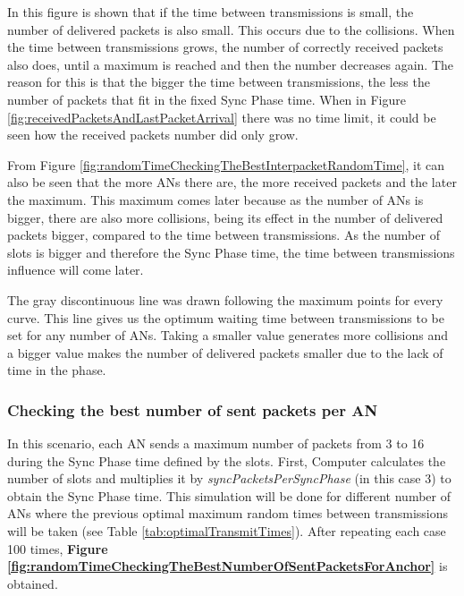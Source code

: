 In this figure is shown that if the time between transmissions is small, the number of delivered packets is also small. This occurs due to the 
collisions. When the time between transmissions grows, the number of correctly received packets also does, until a maximum is reached and then 
the number decreases again. The reason for this is that the bigger the time between transmissions, the less the number of packets that fit 
in the fixed Sync Phase time. When in Figure \ref{fig:receivedPacketsAndLastPacketArrival} there was no time limit, it could be seen how the 
received packets number did only grow.

From Figure \ref{fig:randomTimeCheckingTheBestInterpacketRandomTime}, it can also be seen that the more \acp{AN} there are, the more received packets and
the later the maximum. This maximum comes later because as the number of \acp{AN} is bigger, there are also more collisions, being its effect in the 
number of delivered packets bigger, compared to the time between transmissions. As the number of slots is bigger and therefore the Sync Phase time, the 
time between transmissions influence will come later.

The gray discontinuous line was drawn following the maximum points for every curve. This line gives us the optimum waiting time between transmissions to 
be set for any number of \acp{AN}. Taking a smaller value generates more collisions and a bigger value makes the number of delivered packets smaller due
to the lack of time in the phase.

\subsubsection{Checking the best number of sent packets per \ac{AN}}

In this scenario, each \ac{AN} sends a maximum number of packets from 3 to 16 during the Sync Phase time defined by the slots. First, Computer calculates 
the number of slots and multiplies it by \textit{syncPacketsPerSyncPhase} (in this case 3) to obtain the Sync Phase time. This simulation will be done 
for different number of \acp{AN} where the previous optimal maximum random times between transmissions will be taken (see Table
\ref{tab:optimalTransmitTimes}). After repeating each case 100 times, \textbf{Figure \ref{fig:randomTimeCheckingTheBestNumberOfSentPacketsForAnchor}} 
is obtained.

